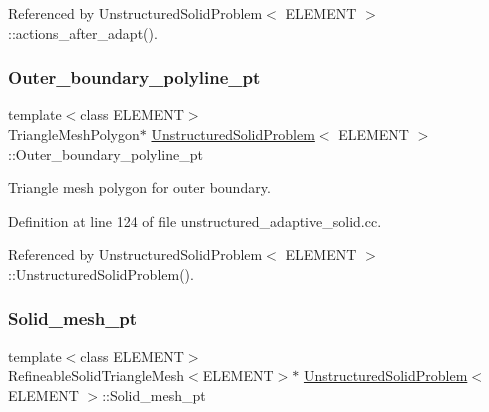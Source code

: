 Referenced by Unstructured\+Solid\+Problem$<$ E\+L\+E\+M\+E\+N\+T $>$\+::actions\+\_\+after\+\_\+adapt().

\mbox{\label{classUnstructuredSolidProblem_a2e7ef7b4984d6d2a063c0c2374931d0c}} 
\subsubsection{\texorpdfstring{Outer\+\_\+boundary\+\_\+polyline\+\_\+pt}{Outer\_boundary\_polyline\_pt}}
{\footnotesize\ttfamily template$<$class E\+L\+E\+M\+E\+NT$>$ \\
Triangle\+Mesh\+Polygon$\ast$ \hyperlink{classUnstructuredSolidProblem}{Unstructured\+Solid\+Problem}$<$ E\+L\+E\+M\+E\+NT $>$\+::Outer\+\_\+boundary\+\_\+polyline\+\_\+pt\hspace{0.3cm}{\ttfamily [private]}}



Triangle mesh polygon for outer boundary. 



Definition at line 124 of file unstructured\+\_\+adaptive\+\_\+solid.\+cc.



Referenced by Unstructured\+Solid\+Problem$<$ E\+L\+E\+M\+E\+N\+T $>$\+::\+Unstructured\+Solid\+Problem().

\mbox{\label{classUnstructuredSolidProblem_af121067bd532a78b4360373b60aaddd0}} 
\subsubsection{\texorpdfstring{Solid\+\_\+mesh\+\_\+pt}{Solid\_mesh\_pt}}
{\footnotesize\ttfamily template$<$class E\+L\+E\+M\+E\+NT$>$ \\
Refineable\+Solid\+Triangle\+Mesh$<$E\+L\+E\+M\+E\+NT$>$$\ast$ \hyperlink{classUnstructuredSolidProblem}{Unstructured\+Solid\+Problem}$<$ E\+L\+E\+M\+E\+NT $>$\+::Solid\+\_\+mesh\+\_\+pt\hspace{0.3cm}{\ttfamily [private]}}



